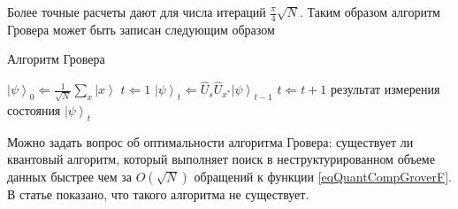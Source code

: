 Более точные расчеты \cite{nielsen2000quantum} дают для числа итераций
$\frac{\pi}{4}\sqrt{N}$. Таким образом алгоритм Гровера может быть
записан следующим образом  
\begin{algorithm}
\caption{Алгоритм Гровера}
\label{algQuantCompGrover}
\begin{algorithmic}
    \STATE $\left|\psi\right>_0 \Leftarrow \frac{1}{\sqrt{N}}\sum_x 
    \left|x\right>$
    \STATE $t \Leftarrow 1$
    \REPEAT
    \STATE $\left|\psi\right>_t \Leftarrow \hat{U}_s\hat{U}_{x^{\ast}}
    \left|\psi\right>_{t-1}$
    \STATE $t \Leftarrow t + 1$
    \RETURN результат измерения состояния $\left|\psi\right>_t$
\end{algorithmic}
\end{algorithm}

Можно задать вопрос об оптимальности алгоритма Гровера: существует ли
квантовый алгоритм, который выполняет поиск в неструктурированном
объеме данных быстрее чем за $O\left(\sqrt{N}\right)$ обращений к
функции \eqref{eqQuantCompGroverF}. В статье
\cite{bBennettGroverOptimal} показано, что такого алгоритма
не существует.
